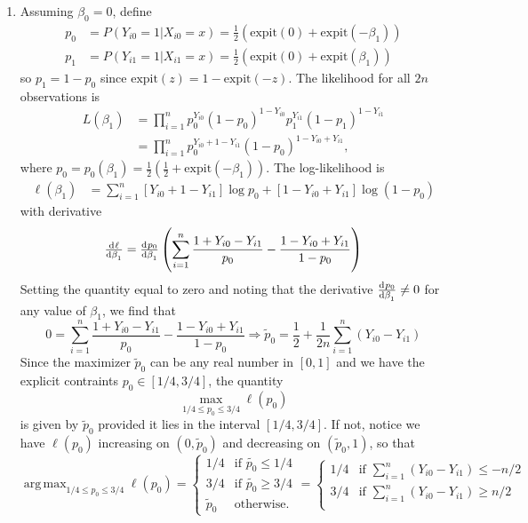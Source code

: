 \documentclass[11pt]{article}
\DeclareMathOperator*{\argmax}{arg\,max}
\begin{document}
\begin{enumerate}
\begin{enumerate}
			\item Assuming $\beta_0=0$, define
			\begin{align*}
				p_0 &= P(Y_{i0}=1|X_{i0}=x) = \frac{1}{2}(\mathrm{expit}(0) + \mathrm{expit}(-\beta_1)) \\
				p_1 &= P(Y_{i1}=1|X_{i1}=x) = \frac{1}{2}(\mathrm{expit}(0) + \mathrm{expit}(\beta_1))
			\end{align*}
			so $p_1=1-p_0$ since $\mathrm{expit}(z) = 1-\mathrm{expit}(-z)$. The likelihood for all $2n$ observations is
			\begin{align*}
				L(\beta_1) &= \prod_{i=1}^n p_0^{Y_{i0}}(1-p_0)^{1-Y_{i0}}p_1^{Y_{i1}}(1-p_1)^{1-Y_{i1}} \\
				&= \prod_{i=1}^n p_0^{Y_{i0}+1-Y_{i1}}(1-p_0)^{1-Y_{i0}+Y_{i1}},
			\end{align*}
			where $p_0 = p_0(\beta_1) = \frac{1}{2}(\frac{1}{2}+\mathrm{expit}(-\beta_1))$. The log-likelihood is
			\begin{align*}
				\ell(\beta_1) &= \sum_{i=1}^n [Y_{i0}+1-Y_{i1}]\log p_0 + [1-Y_{i0}+Y_{i1}]\log(1-p_0)
			\end{align*}
			with derivative
			\[
			 \od{\ell}{\beta_1} = \od{p_0}{\beta_1}\left( \sum_{i=1}^n \frac{1+Y_{i0}-Y_{i1}}{p_0} - \frac{1-Y_{i0}+Y_{i1}}{1-p_0} \right)
			\]
			Setting the quantity equal to zero and noting that the derivative $\od{p_0}{\beta_1} \neq 0$ for any value of $\beta_1$, we find that
			\[
				0 = \sum_{i=1}^n \frac{1+Y_{i0}-Y_{i1}}{p_0} - \frac{1-Y_{i0}+Y_{i1}}{1-p_0} \Longrightarrow \widetilde{p}_0 = \frac{1}{2} + \frac{1}{2n}\sum_{i=1}^n (Y_{i0}-Y_{i1})
			\]
			Since the maximizer $\widetilde{p}_0$ can be any real number in $[0,1]$ and we have the explicit contraints $p_0\in [1/4, 3/4]$, the quantity
			\[
				\max_{1/4\leq p_0\leq 3/4} \ell(p_0)
			\]
			is given by $\widetilde{p}_0$ provided it lies in the interval $[1/4, 3/4]$. If not, notice we have $\ell(p_0)$ increasing on $(0,\widetilde{p}_0)$ and decreasing on $(\widetilde{p}_0,1)$, so that
			\[
				\argmax_{1/4\leq p_0\leq 3/4} \ell(p_0) = \begin{cases}
					1/4 & \text{if } \widetilde{p_0}\leq 1/4 \\
					3/4 & \text{if } \widetilde{p_0} \geq 3/4 \\
					\widetilde{p}_0 & \text{otherwise.}
				\end{cases} = \begin{cases}
					1/4 & \text{if } \sum_{i=1}^n (Y_{i0}-Y_{i1}) \leq -n/2 \\
					3/4 & \text{if } \sum_{i=1}^n (Y_{i0}-Y_{i1}) \geq n/2 \\

\end{cases}\]
\end{enumerate}
\end{enumerate}
\end{document}
